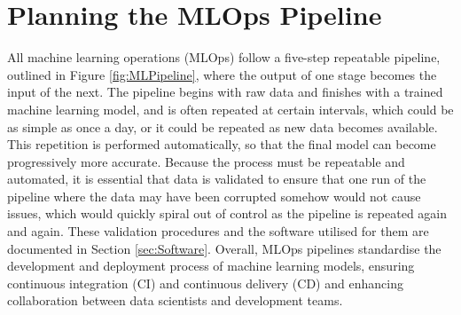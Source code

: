 \documentclass[12pt]{report}
\begin{document}
\chapter{Planning the MLOps Pipeline}
All machine learning operations (MLOps) follow a five-step repeatable pipeline, outlined in Figure \ref{fig:MLPipeline}, where the output of one stage
becomes the input of the next. The pipeline begins with raw data and finishes with a trained machine learning model, and is often 
repeated at certain intervals, which could be as simple as once a day, or it could be repeated as new data becomes available. 
This repetition is performed automatically, so that the final model can become progressively more accurate. Because the process 
must be repeatable and automated, it is essential that data is validated to ensure that one run of the pipeline where the data may have 
been corrupted somehow would not cause issues, which would quickly spiral out of control as the pipeline is repeated again and again.
These validation procedures and the software utilised for them are documented in Section \ref{sec:Software}.
Overall, MLOps pipelines standardise the development and deployment process of machine learning models, ensuring continuous integration
(CI) and continuous delivery (CD) and enhancing collaboration between data scientists and development teams.





\end{document}
